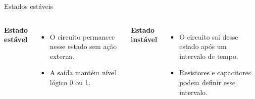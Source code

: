 \begin{frame}{Estados estáveis}
\begin{columns}[T]
\textbf{Estado estável}
\begin{itemize}
\item O circuito permanece nesse estado sem ação externa.
\item A saída mantém nível lógico 0 ou 1.
\end{itemize}
\textbf{Estado instável}
\begin{itemize}
\item O circuito sai desse estado após um intervalo de tempo.
\item Resistores e capacitores podem definir esse intervalo.
\end{itemize}
\end{columns}
\end{frame}
